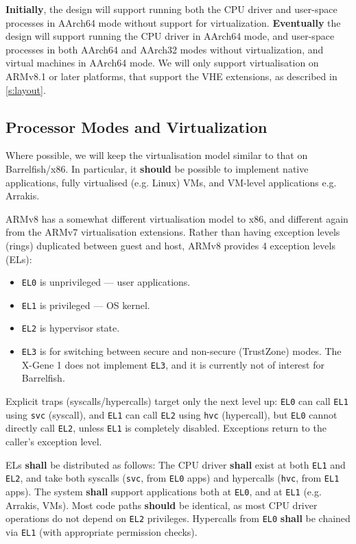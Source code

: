 \documentclass[a4paper,twoside]{report}
\begin{document}
\textbf{Initially}, the design will support running both the CPU driver and
user-space processes in AArch64 mode without support for virtualization.
\textbf{Eventually} the design will support running the CPU driver in AArch64
mode, and user-space processes in both AArch64 and AArch32 modes without
virtualization, and virtual machines in AArch64 mode. We will only support
virtualisation on ARMv8.1 or later platforms, that support the VHE extensions,
as described in \autoref{s:layout}.

\subsection{Processor Modes and Virtualization}

Where possible, we will keep the virtualisation model similar to that on
Barrelfish/x86. In particular, it \textbf{should} be possible to implement
native applications, fully virtualised (e.g. Linux) VMs, and VM-level
applications e.g. Arrakis\citep{peter:osdi14}.

ARMv8 has a somewhat different virtualisation model to x86, and different
again from the ARMv7 virtualisation extensions. Rather than having exception
levels (rings) duplicated between guest and host, ARMv8 provides 4 exception
levels (ELs):

\begin{itemize}
\item \texttt{EL0} is unprivileged --- user applications.
\item \texttt{EL1} is privileged --- OS kernel.
\item \texttt{EL2} is hypervisor state.
\item \texttt{EL3} is for switching between secure and non-secure (TrustZone)
                   modes. The X-Gene 1 does not implement \texttt{EL3}, and it
                   is currently not of interest for Barrelfish.
\end{itemize}

Explicit traps (syscalls/hypercalls) target only the next level up:
\texttt{EL0} can call \texttt{EL1} using \texttt{svc} (syscall), and
\texttt{EL1} can call \texttt{EL2} using \texttt{hvc} (hypercall), but
\texttt{EL0} cannot directly call \texttt{EL2}, unless \texttt{EL1} is
completely disabled.  Exceptions return to the caller's exception level.

ELs \textbf{shall} be distributed as follows: The CPU driver \textbf{shall}
exist at both \texttt{EL1} and \texttt{EL2}, and take both syscalls
(\texttt{svc}, from \texttt{EL0} apps) and hypercalls (\texttt{hvc}, from
\texttt{EL1} apps). The system \textbf{shall} support applications both at
\texttt{EL0}, and at \texttt{EL1} (e.g.  Arrakis, VMs).  Most code paths
\textbf{should} be identical, as most CPU driver operations do not depend on
\texttt{EL2} privileges.  Hypercalls from \texttt{EL0} \textbf{shall} be
chained via \texttt{EL1} (with appropriate permission checks).
\end{document}
